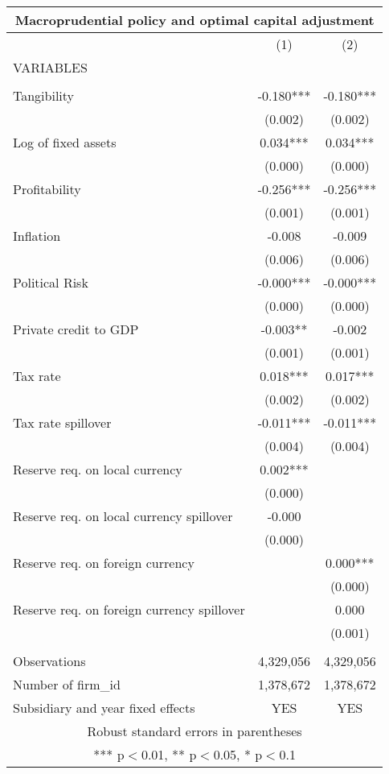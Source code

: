 \begin{tabular}{lcc}
\multicolumn{3}{c}{Macroprudential policy and optimal capital adjustment} \\ \hline
 & (1) & (2) \\
VARIABLES &  &  \\ \hline
 &  &  \\
Tangibility & -0.180*** & -0.180*** \\
 & (0.002) & (0.002) \\
Log of fixed assets & 0.034*** & 0.034*** \\
 & (0.000) & (0.000) \\
Profitability & -0.256*** & -0.256*** \\
 & (0.001) & (0.001) \\
Inflation & -0.008 & -0.009 \\
 & (0.006) & (0.006) \\
Political Risk & -0.000*** & -0.000*** \\
 & (0.000) & (0.000) \\
Private credit to GDP & -0.003** & -0.002 \\
 & (0.001) & (0.001) \\
Tax rate & 0.018*** & 0.017*** \\
 & (0.002) & (0.002) \\
Tax rate spillover & -0.011*** & -0.011*** \\
 & (0.004) & (0.004) \\
Reserve req. on local currency & 0.002*** &  \\
 & (0.000) &  \\
Reserve req. on local currency spillover & -0.000 &  \\
 & (0.000) &  \\
Reserve req. on foreign currency &  & 0.000*** \\
 &  & (0.000) \\
Reserve req. on foreign currency spillover &  & 0.000 \\
 &  & (0.001) \\
 &  &  \\
Observations & 4,329,056 & 4,329,056 \\
Number of firm\_id & 1,378,672 & 1,378,672 \\
 Subsidiary and year fixed effects & YES & YES \\ \hline
\multicolumn{3}{c}{ Robust standard errors in parentheses} \\
\multicolumn{3}{c}{ *** p$<$0.01, ** p$<$0.05, * p$<$0.1} \\
\end{tabular}
